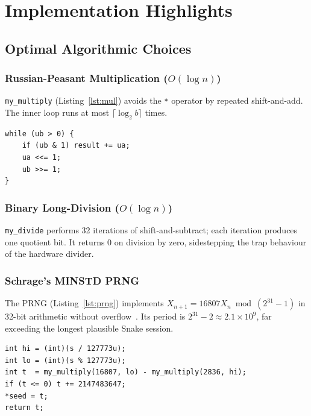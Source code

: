 \documentclass[conference]{IEEEtran}
\begin{document}
\section{Implementation Highlights}
\label{sec:impl}

\subsection{Optimal Algorithmic Choices}

\subsubsection{Russian-Peasant Multiplication ($O(\log n)$)}
\texttt{my\_multiply} (Listing~\ref{lst:mul}) avoids the \texttt{*} operator by repeated shift-and-add. The inner loop runs at most $\lceil \log_2 b \rceil$ times.

\begin{lstlisting}[caption={Russian-peasant multiplication.},label={lst:mul}]
while (ub > 0) {
    if (ub & 1) result += ua;
    ua <<= 1;
    ub >>= 1;
}
\end{lstlisting}

\subsubsection{Binary Long-Division ($O(\log n)$)}
\texttt{my\_divide} performs 32 iterations of shift-and-subtract; each iteration produces one quotient bit. It returns 0 on division by zero, sidestepping the trap behaviour of the hardware divider.

\subsubsection{Schrage's MINSTD PRNG}
The PRNG (Listing~\ref{lst:prng}) implements $X_{n+1} = 16807 X_n \bmod (2^{31}-1)$ in 32-bit arithmetic without overflow~\cite{park1988,schrage1979}. Its period is $2^{31}-2 \approx 2.1 \times 10^{9}$, far exceeding the longest plausible Snake session.

\begin{lstlisting}[caption={Overflow-safe MINSTD via Schrage's method.},label={lst:prng}]
int hi = (int)(s / 127773u);
int lo = (int)(s % 127773u);
int t  = my_multiply(16807, lo) - my_multiply(2836, hi);
if (t <= 0) t += 2147483647;
*seed = t;
return t;
\end{lstlisting}
\end{document}
